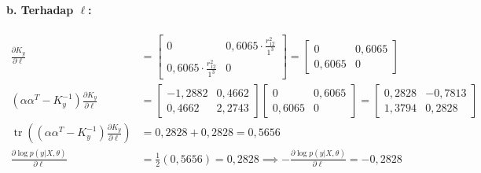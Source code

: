 \documentclass[11pt,a4paper]{article}
\def\boldsymbol#1{#1}%
\def\mathbf#1{#1}%
\begin{document}
\paragraph*{b. Terhadap \texorpdfstring{$\ell$}{l}:}
\begin{align}
\frac{\partial K_y}{\partial \ell} &= \begin{bmatrix} 0 & 0{,}6065 \cdot \frac{r_{12}^2}{1^3} \\ 0{,}6065 \cdot \frac{r_{12}^2}{1^3} & 0 \end{bmatrix} = \begin{bmatrix} 0 & 0{,}6065 \\ 0{,}6065 & 0 \end{bmatrix} \\
\left( \boldsymbol{\alpha}\boldsymbol{\alpha}^T - K_y^{-1} \right) \frac{\partial K_y}{\partial \ell} &= \begin{bmatrix} -1{,}2882 & 0{,}4662 \\ 0{,}4662 & 2{,}2743 \end{bmatrix} \begin{bmatrix} 0 & 0{,}6065 \\ 0{,}6065 & 0 \end{bmatrix} = \begin{bmatrix} 0{,}2828 & -0{,}7813 \\ 1{,}3794 & 0{,}2828 \end{bmatrix} \\
\operatorname{tr}\left( \left( \boldsymbol{\alpha}\boldsymbol{\alpha}^T - K_y^{-1} \right) \frac{\partial K_y}{\partial \ell} \right) &= 0{,}2828 + 0{,}2828 = 0{,}5656 \\
\frac{\partial \log p(\mathbf{y}|X, \boldsymbol{\theta})}{\partial \ell} &= \frac{1}{2} (0{,}5656) = 0{,}2828 \implies -\frac{\partial \log p(\mathbf{y}|X, \boldsymbol{\theta})}{\partial \ell} = -0{,}2828
\end{align}
\end{document}
